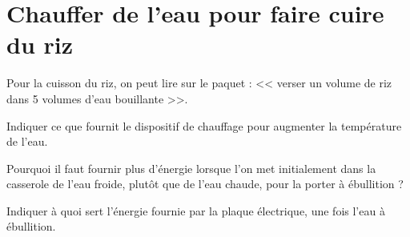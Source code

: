 \section{Chauffer de l'eau pour faire cuire du riz}

Pour la cuisson du riz, on peut lire sur le paquet : << verser un volume de riz dans 5 volumes d'eau bouillante >>.

\begin{questions}
	\question Indiquer ce que fournit le dispositif de chauffage pour augmenter la température de l'eau.
	
	\question Pourquoi il faut fournir plus d'énergie lorsque l'on met initialement dans la casserole de l'eau froide, plutôt que de l'eau chaude, pour la porter à ébullition ?
	
	\question Indiquer à quoi sert l'énergie fournie par la plaque électrique, une fois l'eau à ébullition.
\end{questions}